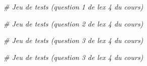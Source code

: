 \documentclass[
  paper=a4,
  ,captions=tableheading
]{scrartcl}
\newenvironment{Shaded}{}{}
\newcommand{\CommentTok}[1]{\textcolor[rgb]{0.38,0.63,0.69}{\textit{#1}}}
\begin{document}
\begin{Shaded}
\begin{Highlighting}[]
\CommentTok{\# Jeu de tests (question 1 de l\textquotesingle{}ex 4 du cours)}
\end{Highlighting}
\end{Shaded}

\begin{Shaded}
\begin{Highlighting}[]
\CommentTok{\# Jeu de tests (question 2 de l\textquotesingle{}ex 4 du cours)}
\end{Highlighting}
\end{Shaded}

\begin{Shaded}
\begin{Highlighting}[]
\CommentTok{\# Jeu de tests (question 3 de l\textquotesingle{}ex 4 du cours)}
\end{Highlighting}
\end{Shaded}

\begin{Shaded}
\begin{Highlighting}[]
\CommentTok{\# Jeu de tests (question 3 de l\textquotesingle{}ex 4 du cours)}
\end{Highlighting}
\end{Shaded}
\end{document}
